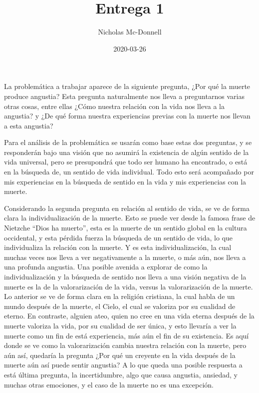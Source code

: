 \documentclass{homework}
\title{Entrega 1}
\date{2020-03-26}
\author{Nicholas Mc-Donnell}
\begin{document}
\maketitle
\newpage
{}

La problemática a trabajar aparece de la siguiente pregunta, ¿Por qué la muerte produce angustia? Esta pregunta naturalmente nos lleva a preguntarnos varias otras cosas, entre ellas ¿Cómo nuestra relación con la vida nos lleva a la angustia? y ¿De qué forma nuestra experiencias previas con la muerte nos llevan a esta angustia?

Para el análisis de la problemática se usarán como base estas dos preguntas, y se responderán bajo una visión que no asumirá la existencia de algún sentido de la vida universal, pero se presupondrá que todo ser humano ha encontrado, o está en la búsqueda de, un sentido de vida individual. Todo esto será acompañado por mis experiencias en la búsqueda de sentido en la vida y mis experiencias con la muerte.

Considerando la segunda pregunta en relación al sentido de vida, se ve de forma clara la individualización de la muerte. Esto se puede ver desde la famosa frase de Nietzche ``Dios ha muerto'', esta es la muerte de un sentido global en la cultura occidental, y esta pérdida fuerza la búsqueda de un sentido de vida, lo que individualiza la relación con la muerte. Y es esta individualización, la cual muchas veces nos lleva a ver negativamente a la muerte, o más aún, nos lleva a una profunda angustia. Una posible avenida a explorar de como la individualización y la búsqueda de sentido nos lleva a una visión negativa de la muerte es la de la valorarización de la vida, versus la valorarización de la muerte. Lo anterior se ve de forma clara en la religión cristiana, la cual habla de un mundo después de la muerte, el Cielo, el cual se valoriza por su cualidad de eterno. En contraste, alguien ateo, quien no cree en una vida eterna después de la muerte valoriza la vida, por su cualidad de ser única, y esto llevaría a ver la muerte como un fin de está experiencia, más aún el fin de su existencia. Es aquí donde se ve como la valorarización cambia nuestra relación con la muerte, pero aún así, quedaría la pregunta ¿Por qué un creyente en la vida después de la muerte aún así puede sentir angustia? A lo que queda una posible respuesta a está última pregunta, la incertidumbre, algo que causa angustia, ansiedad, y muchas otras emociones, y el caso de la muerte no es una excepción.
\end{document}
